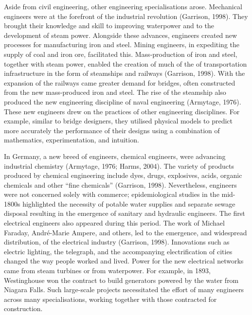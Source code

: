 \documentclass[]{book}
\theoremstyle{definition}
\theoremstyle{definition}
\theoremstyle{definition}
\theoremstyle{remark}
\begin{document}
Aside from civil engineering, other engineering specialisations arose.
Mechanical engineers were at the forefront of the industrial revolution
(Garrison, 1998). They brought their knowledge and skill to improving
waterpower and to the development of steam power. Alongside these
advances, engineers created new processes for manufacturing iron and
steel. Mining engineers, in expediting the supply of coal and iron ore,
facilitated this. Mass-production of iron and steel, together with steam
power, enabled the creation of much of the of transportation
infrastructure in the form of steamships and railways (Garrison, 1998).
With the expansion of the railways came greater demand for bridges,
often constructed from the new mass-produced iron and steel. The rise of
the steamship also produced the new engineering discipline of naval
engineering (Armytage, 1976). These new engineers drew on the practices
of other engineering disciplines. For example, similar to bridge
designers, they utilised physical models to predict more accurately the
performance of their designs using a combination of mathematics,
experimentation, and intuition.

In Germany, a new breed of engineers, chemical engineers, were advancing
industrial chemistry (Armytage, 1976; Harms, 2004). The variety of
products produced by chemical engineering include dyes, drugs,
explosives, acids, organic chemicals and other ``fine chemicals''
(Garrison, 1998). Nevertheless, engineers were not concerned solely with
commerce; epidemiological studies in the mid-1800s highlighted the
necessity of potable water supplies and separate sewage disposal
resulting in the emergence of sanitary and hydraulic engineers. The
first electrical engineers also appeared during this period. The work of
Michael Faraday, André-Marie Ampere, and others, led to the emergence,
and widespread distribution, of the electrical industry (Garrison,
1998). Innovations such as electric lighting, the telegraph, and the
accompanying electrification of cities changed the way people worked and
lived. Power for the new electrical networks came from steam turbines or
from waterpower. For example, in 1893, Westinghouse won the contract to
build generators powered by the water from Niagara Falls. Such
large-scale projects necessitated the effort of many engineers across
many specialisations, working together with those contracted for
construction.
\end{document}
